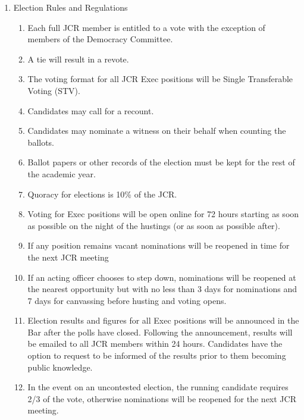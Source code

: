 \begin{enumerate}
\begin{enumerate}
    \end{enumerate}
    \item Election Rules and Regulations
    \begin{enumerate}
        \item Each full JCR member is entitled to a vote with the exception of members of the Democracy Committee.
        \item A tie will result in a revote.
        \item The voting format for all JCR Exec positions will be Single Transferable Voting (STV). 
        \item Candidates may call for a recount.
        \item Candidates may nominate a witness on their behalf when counting the ballots.
        \item Ballot papers or other records of the election must be kept for the rest of the academic year.
        \item Quoracy for elections is 10\% of the JCR.
        \item Voting for Exec positions will be open online for 72 hours starting as soon as possible on the night of the hustings (or as soon as possible after).
        \item If any position remains vacant nominations will be reopened in time for the next JCR meeting
        \item If an acting officer chooses to step down, nominations will be reopened at the nearest opportunity but with no less than 3 days for nominations and 7 days for canvassing before husting and voting opens.
        \item Election results and figures for all Exec positions will be announced in the Bar after the polls have closed. Following the announcement, results will be emailed to all JCR members within 24 hours. Candidates have the option to request to be informed of the results prior to them becoming public knowledge.
        \item In the event on an uncontested election, the running candidate requires 2/3 of the vote, otherwise nominations will be reopened for the next JCR meeting.
    \end{enumerate}
\end{enumerate}

